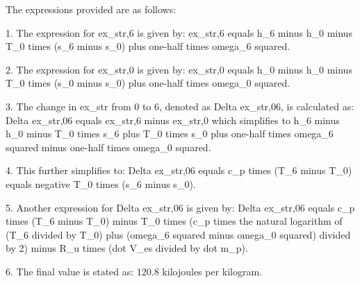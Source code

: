 The expressions provided are as follows:

1. The expression for ex_str,6 is given by:
   ex_str,6 equals h_6 minus h_0 minus T_0 times (s_6 minus s_0) plus one-half times omega_6 squared.

2. The expression for ex_str,0 is given by:
   ex_str,0 equals h_0 minus h_0 minus T_0 times (s_0 minus s_0) plus one-half times omega_0 squared.

3. The change in ex_str from 0 to 6, denoted as Delta ex_str,06, is calculated as:
   Delta ex_str,06 equals ex_str,6 minus ex_str,0 which simplifies to h_6 minus h_0 minus T_0 times s_6 plus T_0 times s_0 plus one-half times omega_6 squared minus one-half times omega_0 squared.

4. This further simplifies to:
   Delta ex_str,06 equals c_p times (T_6 minus T_0) equals negative T_0 times (s_6 minus s_0).

5. Another expression for Delta ex_str,06 is given by:
   Delta ex_str,06 equals c_p times (T_6 minus T_0) minus T_0 times (c_p times the natural logarithm of (T_6 divided by T_0) plus (omega_6 squared minus omega_0 squared) divided by 2) minus R_u times (dot V_es divided by dot m_p).

6. The final value is stated as:
   120.8 kilojoules per kilogram.